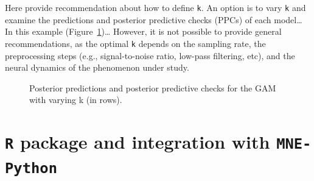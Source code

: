 \documentclass[
  man,
  floatsintext,
  longtable,
  a4paper,
  nolmodern,
  notxfonts,
  notimes,
  colorlinks=true,linkcolor=blue,citecolor=blue,urlcolor=blue]{apa7}
\begin{document}
Here provide recommendation about how to define \texttt{k}. An option is
to vary \texttt{k} and examine the predictions and posterior predictive
checks (PPCs) of each model\ldots{} In this example
(Figure~\ref{fig-choose-k})\ldots{} However, it is not possible to
provide general recommendations, as the optimal \texttt{k} depends on
the sampling rate, the preprocessing steps (e.g., signal-to-noise ratio,
low-pass filtering, etc), and the neural dynamics of the phenomenon
under study.

\begin{figure}[!htb]

\caption{\label{fig-choose-k}Posterior predictions and posterior
predictive checks for the GAM with varying k (in rows).}


\end{figure}%

\newpage

\section{\texorpdfstring{\texttt{R} package and integration with
\texttt{MNE-Python}}{R package and integration with MNE-Python}}\label{r-package-and-integration-with-mne-python}
\end{document}
